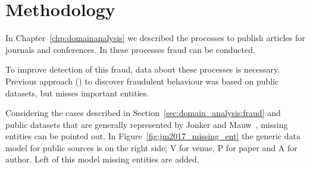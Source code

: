 \documentclass{ou-report}
\begin{document}




\chapter{Methodology}
\label{chp:methodology}
In Chapter~\ref{chp:domainanalysis} we described the processes to publish 
articles for journals and conferences. In these processes fraud can be conducted.

To improve detection of this fraud, data about these processes is necessary.
Previous approach (\cite{TEJ2017}) to discover fraudulent behaviour was based 
on public datasets, but misses important entities. 

Considering the cases described in Section~\ref{sec:domain_analysis:fraud} and 
public datasets that are generally represented by Jonker and Mauw~\cite{JM2017},
missing entities can be pointed out.
In Figure~\ref{fig:jm2017_missing_ent} the generic data model for public 
sources is on the right side; V for venue, P for paper and A for author. Left of 
this model missing entities are added.

\end{document}
